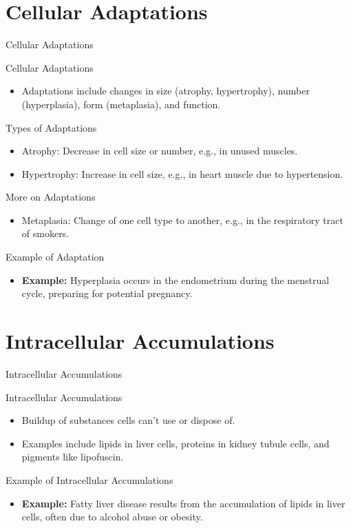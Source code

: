 \documentclass{beamer}
\begin{document}
	\section{Cellular Adaptations}
	\begin{frame}{Cellular Adaptations}
	\end{frame}
	\begin{frame}{Cellular Adaptations}
		\begin{itemize}
			\item Adaptations include changes in size (atrophy, hypertrophy), number (hyperplasia), form (metaplasia), and function.
		\end{itemize}
	\end{frame}
	\begin{frame}{Types of Adaptations}
		\begin{itemize}
			\item Atrophy: Decrease in cell size or number, e.g., in unused muscles.
			\item Hypertrophy: Increase in cell size, e.g., in heart muscle due to hypertension.
		\end{itemize}
	\end{frame}
	\begin{frame}{More on Adaptations}
		\begin{itemize}
			\item Metaplasia: Change of one cell type to another, e.g., in the respiratory tract of smokers.
		\end{itemize}
	\end{frame}
	\begin{frame}{Example of Adaptation}
		\begin{itemize}
			\item \textbf{Example:} Hyperplasia occurs in the endometrium during the menstrual cycle, preparing for potential pregnancy.
		\end{itemize}
	\end{frame}
	
	\section{Intracellular Accumulations}
	\begin{frame}{Intracellular Accumulations}
	\end{frame}
	\begin{frame}{Intracellular Accumulations}
		\begin{itemize}
			\item Buildup of substances cells can't use or dispose of.
			\item Examples include lipids in liver cells, proteins in kidney tubule cells, and pigments like lipofuscin.
		\end{itemize}
	\end{frame}
	\begin{frame}{Example of Intracellular Accumulations}
		\begin{itemize}
			\item \textbf{Example:} Fatty liver disease results from the accumulation of lipids in liver cells, often due to alcohol abuse or obesity.
		\end{itemize}
	\end{frame}
	
\end{document}
